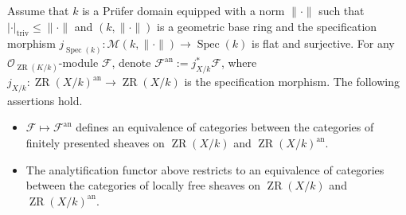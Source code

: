\documentclass [11pt,reqno]{amsart}
\newcommand{\1}{\mathmybb{1}}
\def\cF{{\mathcal{F}}}
\def\cM{{\mathcal{M}}}
\def\cO{{\mathcal{O}}}
\def\cX{{\mathcal{X}}}
\def\an{\operatorname{an}}
\def\Spec{\operatorname{Spec}}
\def\triv{\operatorname{triv}}
\def\ZR{\operatorname{ZR}}
\begin{document}

\begin{proposition}
\label{prop:GAGA_ZR_sheaf}
Assume that $k$ is a Prüfer domain equipped with a norm $\|\cdot\|$ such that $|\cdot|_{\triv}\leq \|\cdot\|$ and $(k,\|\cdot\|)$ is a geometric base ring and the specification morphism $j_{\Spec(k)} : \cM(k,\|\cdot\|)\to\Spec(k)$ is flat and surjective. For any $\cO_{\ZR(K/k)}$-module $\cF$, denote $\cF^{\an}:=j_{X/k}^{\ast}\cF$, where $j_{X/k}:\ZR(X/k)^{\an}\to\ZR(X/k)$ is the specification morphism. The following assertions hold.
\begin{itemize}
	\item[(1)] $\cF\mapsto \cF^{\an}$ defines an equivalence of categories between the categories of finitely presented sheaves on $\ZR(X/k)$ and $\ZR(X/k)^{\an}$.
	\item[(2)] The analytification functor above restricts to an equivalence of categories between the categories of locally free sheaves on $\ZR(X/k)$ and $\ZR(X/k)^{\an}$.
\end{itemize}
\end{proposition}
\end{document}
